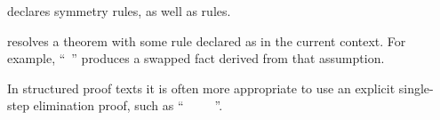 \begin{isabellebody}
\begin{isamarkuptext}
\begin{descr}
  \item [\mbox{\isa{sym}}] declares symmetry rules, as well as
  \mbox{} rules.

  \item [\mbox{\isa{symmetric}}] resolves a theorem with some rule
  declared as \mbox{} in the current context.  For example,
  ``\mbox{}~'' produces a
  swapped fact derived from that assumption.

  In structured proof texts it is often more appropriate to use an
  explicit single-step elimination proof, such as ``\mbox{}~~\mbox{}~\mbox{}~~\mbox{\isa{\isacommand{{\isachardot}{\isachardot}}}}''.

  \end{descr}%
\end{isamarkuptext}%
\isamarkuptrue%
%
\isadelimtheory
%
\endisadelimtheory
%
\isatagtheory
{}\isamarkupfalse%
%
\endisatagtheory
{\isafoldtheory}%
%
\isadelimtheory
%
\endisadelimtheory
\isanewline
\end{isabellebody}%
